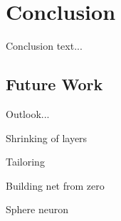 \chapter{Conclusion} \label{chap:conclusion}
Conclusion text...

\section{Future Work} \label{sec:future_work}
Outlook...

Shrinking of layers

Tailoring

Building net from zero

Sphere neuron